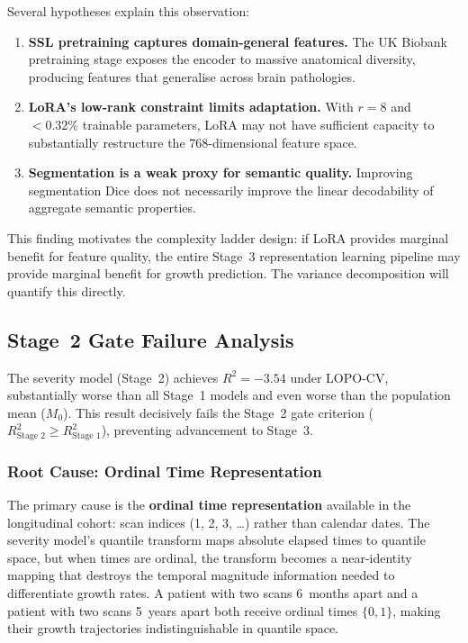 Several hypotheses explain this observation:
\begin{enumerate}[leftmargin=*]
  \item \textbf{SSL pretraining captures domain-general features.} The UK
    Biobank pretraining stage exposes the encoder to massive anatomical
    diversity, producing features that generalise across brain pathologies.
  \item \textbf{LoRA's low-rank constraint limits adaptation.} With
    $r = 8$ and $<0.32\%$ trainable parameters, LoRA may not have
    sufficient capacity to substantially restructure the 768-dimensional
    feature space.
  \item \textbf{Segmentation is a weak proxy for semantic quality.}
    Improving segmentation Dice does not necessarily improve the linear
    decodability of aggregate semantic properties.
\end{enumerate}

This finding motivates the complexity ladder design: if LoRA provides
marginal benefit for feature quality, the entire Stage~3 representation
learning pipeline may provide marginal benefit for growth prediction.
The variance decomposition will quantify this directly.

\subsection{Stage~2 Gate Failure Analysis}
\label{sec:eval:stage2_failure}

The severity model (Stage~2) achieves $R^2 = -3.54$ under LOPO-CV,
substantially worse than all Stage~1 models and even worse than the population
mean ($M_0$). This result decisively fails the Stage~2 gate criterion
($R^2_{\text{Stage~2}} \geq R^2_{\text{Stage~1}}$), preventing advancement to
Stage~3.

\subsubsection{Root Cause: Ordinal Time Representation}

The primary cause is the \textbf{ordinal time representation} available in the
longitudinal cohort: scan indices (1, 2, 3, \ldots) rather than calendar dates.
The severity model's quantile transform maps absolute elapsed times to quantile
space, but when times are ordinal, the transform becomes a near-identity mapping
that destroys the temporal magnitude information needed to differentiate growth
rates. A patient with two scans 6~months apart and a patient with two scans
5~years apart both receive ordinal times $\{0, 1\}$, making their growth
trajectories indistinguishable in quantile space.

